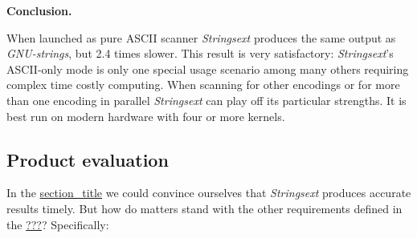 \textbf{Conclusion.}

When launched as pure ASCII scanner \emph{Stringsext} produces the same
output as \emph{GNU-strings}, but 2.4 times slower. This result is very
satisfactory: \emph{Strings­ext}'s ASCII-only mode is only one special
usage scenario among many others requiring complex time costly
computing. When scanning for other encodings or for more than one
encoding in parallel \emph{Strings­ext} can play off its particular
strengths. It is best run on modern hardware with four or more kernels.

\subsection{Product evaluation}\label{_product_evaluation}

In the
\protect\hyperlink{_benchmarking_and_field_experiment}{section\_title}
we could convince ourselves that \emph{Strings­ext} produces accurate
results timely. But how do matters stand with the other requirements
defined in the \protect\hyperlink{_specifications}{???}? Specifically:

